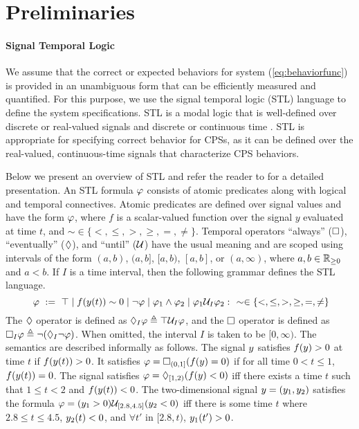 \section{Preliminaries}
\paragraph{Signal Temporal Logic} 

We assume that the correct or expected behaviors for system (\ref{eq:behaviorfunc}) is provided in an unambiguous form that can be efficiently measured and quantified. For this purpose, we use the signal temporal logic (STL) language to define the system specifications.
STL is a modal logic that is well-defined over discrete or real-valued signals and discrete or continuous time \cite{MalerN04}.
STL is appropriate for specifying correct behavior for CPSs, as it can be defined over the real-valued, continuous-time signals that characterize CPS behaviors.
  
Below we present an overview of STL and refer the reader to \cite{MalerN04} for a detailed presentation.
An STL formula $\varphi$ consists of atomic predicates along with logical and temporal connectives.
Atomic predicates are defined over signal values and have the form $\varphi$, where $f$ is a scalar-valued function over the signal $y$ evaluated at time $t$, and $\sim \in \{ <,\leq, >, \geq, =, \neq \}$.
Temporal operators ``always'' ($\Box$), ``eventually'' ($\Diamond$), and ``until'' ($\mathcal{U}$) have the usual meaning and are scoped using intervals of the form $(a,b)$, $(a,b]$, $[a,b)$, $[a,b]$, or $(a,\infty)$, where 
$a,b\in \mathbb{R}_{\geq 0}$ and $a<b$. If $I$ is a time interval, then the following grammar defines the STL language.
\begin{equation}~\label{eqn:stl-gen}
\varphi ~ := ~ \top \; | \; f(y(t))\sim 0 \; | \; \neg \varphi \; | \;
\varphi_1 \wedge \varphi_2 \; | \; \varphi_1 \mathcal{U}_I \varphi_2:~~\sim \in \{ <,\leq,>,\geq,=,\neq \}
\end{equation}
The $\Diamond$ operator is defined as $\Diamond_I \varphi \triangleq \top \mathcal{U}_I \varphi$, and the $\Box$ operator is defined as $\Box_I \varphi \triangleq \neg (\Diamond _I \neg \varphi)$. When omitted, the interval $I$ is taken  to be $[0,\infty)$. The semantics are described informally as follows. The signal $y$ satisfies $f(y)> 0$ at time $t$ if $f(y(t))>0$. It satisfies $\varphi = \Box_{(0,1]}(f(y)=0)$ if for all time $0< t \leq 1$, $f(y(t))=0$. The signal satisfies $\varphi= \Diamond_{[1,2)}(f(y)<0)$ iff there exists a time $t$ such that $1\leq t < 2$ and $f(y(t))<0$. The two-dimensional signal $y=(y_1,y_2)$ satisfies the formula $\varphi=(y_1>0)\mathcal{U}_{[2.8,4.5]}(y_2<0)$ iff there is some time $t$ where $2.8 \leq t \leq 4.5$, $y_2(t)<0$, and $\forall t'$ in $[2.8,t)$, $y_1(t')>0$. 

